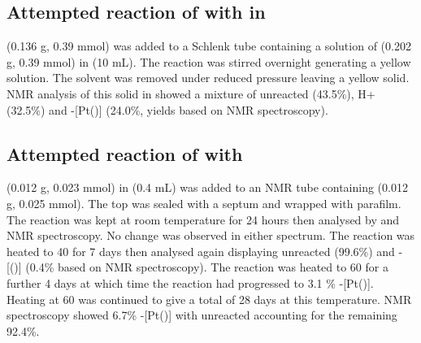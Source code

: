 \subsection*{Attempted reaction of \tButhixantphos{} with \ce{[Pt(C6H10)Cl2]} in\\}

\ce{[Pt(C6H10)Cl2]} (0.136 g, 0.39 mmol) was added to a Schlenk tube containing a solution of  \tButhixantphos{} (0.202 g, 0.39 mmol) in  (10 mL).  The reaction was stirred overnight generating a yellow solution.  The solvent was removed under reduced pressure leaving a yellow solid.  NMR analysis of this solid in  showed a mixture of unreacted \tButhixantphos{} (43.5\%), \tButhixantphos H+ (32.5\%) and \trans-[Pt(\tButhixantphos)] (24.0\%, yields based on \phosphorus{} NMR spectroscopy).  


\subsection*{Attempted reaction of \tButhixantphos{} with }

\tButhixantphos{} (0.012 g, 0.023 mmol) in  (0.4 mL) was added to an NMR tube containing  (0.012 g, 0.025 mmol).  The top was sealed with a septum and wrapped with parafilm.  The reaction was kept at room temperature for 24 hours then analysed by \proton{} and \phosphorus{} NMR spectroscopy.  No change was observed in either spectrum.  The reaction was heated to 40 \degC{} for 7 days then analysed again displaying unreacted \tButhixantphos{} (99.6\%) and \trans-[(\tButhixantphos)] (0.4\% based on \phosphorus{} NMR spectroscopy).  The reaction was heated to 60 \degC{} for a further 4 days at which time the reaction had progressed to 3.1 \% \trans-[Pt(\tButhixantphos)].  Heating at 60 \degC{} was continued to give a total of 28 days at this temperature.  NMR spectroscopy showed 6.7\% \trans-[Pt(\tButhixantphos)] with unreacted \tButhixantphos{} accounting for the remaining 92.4\%.

